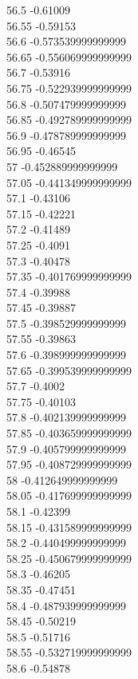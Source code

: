 {56.5	-0.61009\\
56.55	-0.59153\\
56.6	-0.573539999999999\\
56.65	-0.556069999999999\\
56.7	-0.53916\\
56.75	-0.522939999999999\\
56.8	-0.507479999999999\\
56.85	-0.492789999999999\\
56.9	-0.478789999999999\\
56.95	-0.46545\\
57	-0.452889999999999\\
57.05	-0.441349999999999\\
57.1	-0.43106\\
57.15	-0.42221\\
57.2	-0.41489\\
57.25	-0.4091\\
57.3	-0.40478\\
57.35	-0.401769999999999\\
57.4	-0.39988\\
57.45	-0.39887\\
57.5	-0.398529999999999\\
57.55	-0.39863\\
57.6	-0.398999999999999\\
57.65	-0.399539999999999\\
57.7	-0.4002\\
57.75	-0.40103\\
57.8	-0.402139999999999\\
57.85	-0.403659999999999\\
57.9	-0.405799999999999\\
57.95	-0.408729999999999\\
58	-0.412649999999999\\
58.05	-0.417699999999999\\
58.1	-0.42399\\
58.15	-0.431589999999999\\
58.2	-0.440499999999999\\
58.25	-0.450679999999999\\
58.3	-0.46205\\
58.35	-0.47451\\
58.4	-0.487939999999999\\
58.45	-0.50219\\
58.5	-0.51716\\
58.55	-0.532719999999999\\
58.6	-0.54878\\
}

